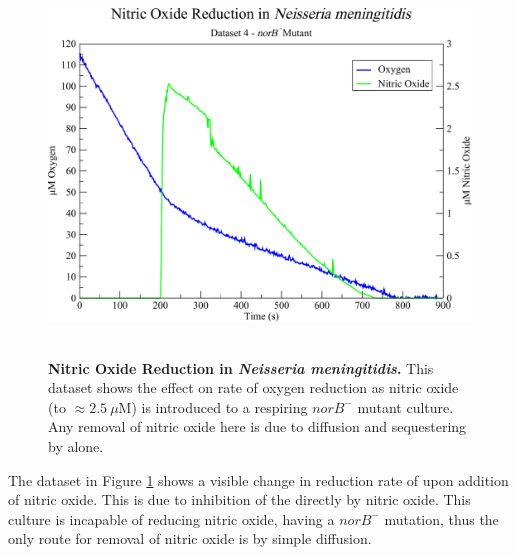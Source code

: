 \begin{figure}[tbp]
 \centering
 \includegraphics[height=10cm, clip=true]{./06-noreduction/data/aer-no-data3.pdf}
 \caption[{Nitric Oxide Reduction in \textit{Neisseria meningitidis}.}]{{\bf Nitric Oxide Reduction in \textit{Neisseria meningitidis}.} This dataset shows the effect on rate of oxygen reduction as nitric oxide (to $\approx 2.5~\mu \mathrm{M}$) is introduced to a respiring $norB^-$ mutant culture. Any removal of nitric oxide here is due to diffusion and sequestering by \cbbthree{} alone.}
 \label{fig:nodata3}
\end{figure}
The dataset in Figure \ref{fig:nodata3} shows a visible change in reduction rate of \cbbthree{} upon addition of nitric oxide. This is due to inhibition of the \cbbthree{} directly by nitric oxide. This culture is incapable of reducing nitric oxide, having a $norB^-$ mutation, thus the only route for removal of nitric oxide is by simple diffusion.

